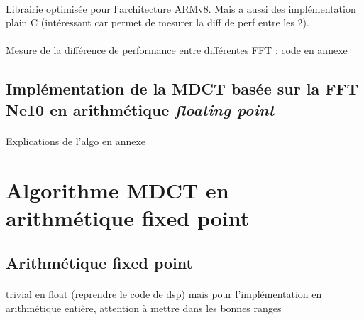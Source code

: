 \documentclass{article}
\begin{document}
    \paragraph{}
    Librairie optimisée pour l'architecture ARMv8. Mais a aussi des implémentation plain C (intéressant car permet de mesurer la diff de perf entre les 2).

    \paragraph{}
    Mesure de la différence de performance entre différentes FFT : code en annexe

    \paragraph{}


    \subsection{Implémentation de la MDCT basée sur la FFT Ne10 en arithmétique \emph{floating point}}
    \paragraph{}
    Explications de l'algo en annexe


    \section{Algorithme MDCT en arithmétique fixed point}
    \label{sec:fixed_point}
    \subsection{Arithmétique fixed point}
    \paragraph{}
    trivial en float (reprendre le code de dsp) mais pour l'implémentation en arithmétique entière, attention à mettre dans les bonnes ranges
\end{document}
